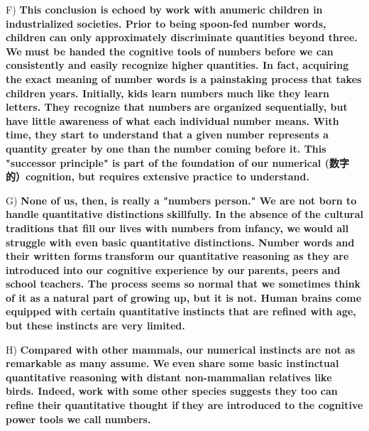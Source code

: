 \documentclass[UTF8,11pt]{ctexart}
\begin{document}
F) \textbf{This conclusion is echoed by work with anumeric children in industrialized societies. Prior to being} \textbf{spoon-fed number words, children can only approximately discriminate quantities beyond three. We} \textbf{must be handed the cognitive tools of numbers before we can consistently and easily recognize higher} \textbf{quantities. In fact, acquiring the exact meaning of number words is a painstaking process that takes} \textbf{children years. Initially, kids learn numbers much like they learn letters. They recognize that numbers} \textbf{are organized sequentially, but have little awareness of what each individual number means. With} \textbf{time, they start to understand that a given number represents a quantity greater by one than the} \textbf{number coming before it. This "successor principle" is part of the foundation of our numerical (数字的）cognition, but requires extensive practice to understand.}


G) \textbf{None of us, then, is really a "numbers person." We are not born to handle quantitative distinctions} \textbf{skillfully. In the absence of the cultural traditions that fill our lives with numbers from infancy, we} \textbf{would all struggle with even basic quantitative distinctions. Number words and their written forms} \textbf{transform our quantitative reasoning as they are introduced into our cognitive experience by our} \textbf{parents, peers and school teachers. The process seems so normal that we sometimes think of it as a} \textbf{natural part of growing up, but it is not. Human brains come equipped with certain quantitative} \textbf{instincts that are refined with age, but these instincts are very limited.}


H) \textbf{Compared with other mammals, our numerical instincts are not as remarkable as many assume. We} \textbf{even share some basic instinctual quantitative reasoning with distant non-mammalian relatives like} \textbf{birds. Indeed, work with some other species suggests they too can refine their quantitative thought if} \textbf{they are introduced to the cognitive power tools we call numbers.}
\end{document}
